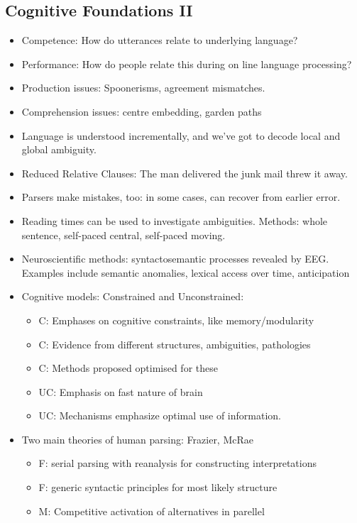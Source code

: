 \documentclass[11pt]{article}
\newenvironment{itemise}{
\begin{itemize}
  \setlength{\itemsep}{1pt}
  \setlength{\parskip}{0pt}
  \setlength{\parsep}{0pt}
}{\end{itemize}}
\begin{document}
\subsection{Cognitive Foundations II}
 \begin{itemise}
 \item Competence: How do utterances relate to underlying language?
 \item Performance: How do people relate this during on line language processing?
 \item Production issues: Spoonerisms, agreement mismatches.
 \item Comprehension issues: centre embedding, garden paths
 \item Language is understood incrementally, and we've got to decode local and global ambiguity.
 \item Reduced Relative Clauses: The man delivered the junk mail threw it away.
 \item Parsers make mistakes, too: in some cases, can recover from earlier error.
 \item Reading times can be used to investigate ambiguities. Methods: whole sentence, self-paced central, self-paced moving.
 \item Neuroscientific methods: syntactosemantic processes revealed by EEG. Examples include semantic anomalies, lexical access over time, anticipation
 \item Cognitive models: Constrained and Unconstrained:
  \begin{itemise}
  \item C: Emphases on cognitive constraints, like memory/modularity
  \item C: Evidence from different structures, ambiguities, pathologies
  \item C: Methods proposed optimised for these
  \item UC: Emphasis on fast nature of brain
  \item UC: Mechanisms emphasize optimal use of information.
 \end{itemise}
 \item Two main theories of human parsing: Frazier, McRae
  \begin{itemise}
  \item F: serial parsing with reanalysis for constructing interpretations
  \item F: generic syntactic principles for most likely structure
  \item M: Competitive activation of alternatives in parellel

\end{itemise}
\end{itemise}
\end{document}
